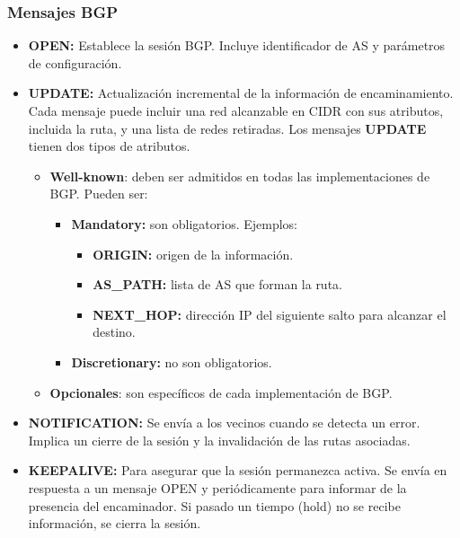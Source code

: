 \subsubsection{Mensajes BGP}
\begin{itemize}
    \item \textbf{OPEN: }Establece la sesión BGP. Incluye identificador de AS y parámetros de configuración.
    \item \textbf{UPDATE: }Actualización incremental de la información de encaminamiento. Cada mensaje puede incluir una red alcanzable en CIDR con sus atributos, incluida la ruta, y una lista de redes retiradas.
    Los mensajes \textbf{UPDATE} tienen dos tipos de atributos.
    \begin{itemize}
    \item \textbf{Well-known}: deben ser admitidos en todas las implementaciones de BGP. Pueden ser:
    \begin{itemize}
        \item \textbf{Mandatory: }son obligatorios. Ejemplos:
        \begin{itemize}
            \item \textbf{ORIGIN: }origen de la información.
            \item \textbf{AS\_PATH: }lista de AS que forman la ruta.
            \item \textbf{NEXT\_HOP: }dirección IP del siguiente salto para alcanzar el destino.
        \end{itemize}
        \item \textbf{Discretionary: }no son obligatorios.
    \end{itemize}
    \item \textbf{Opcionales}: son específicos de cada implementación de BGP.
\end{itemize}
    \item \textbf{NOTIFICATION: }Se envía a los vecinos cuando se detecta un error. Implica un cierre de la sesión y la invalidación de las rutas asociadas.
    \item \textbf{KEEPALIVE: }Para asegurar que la sesión permanezca activa. Se envía en respuesta a un mensaje OPEN y periódicamente para informar de la
    presencia del encaminador. Si pasado un tiempo (hold) no se recibe información, se cierra la sesión.
\end{itemize}
